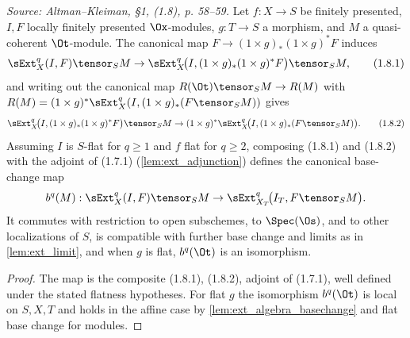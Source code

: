 \begin{definition}
  \label{def:extBaseChangeMap}
  \textit{Source: Altman--Kleiman, §1, (1.8), p. 58--59.}
  Let $f : X \to S$ be finitely presented, $I, F$ locally finitely presented
  $\Ox$-modules, $g : T \to S$ a morphism, and $M$ a quasi-coherent $\Ot$-module.
  The canonical map $F \to (1\times g)_*(1\times g)^* F$ induces
  \[
    \sExt^q_X(I,F) \tensor_S M \to
      \sExt^q_X\!\big(I, (1\times g)_*(1\times g)^* F\big) \tensor_S M,
      \tag{1.8.1}
  \]
  and writing out the canonical map $R(\Ot) \tensor_S M \to R(M)$ with
  $R(M) = (1\times g)^* \sExt^q_X(I, (1\times g)_*(F \tensor_S M))$ gives
  \[
    \sExt^q_X\!\big(I, (1\times g)_*(1\times g)^* F\big) \tensor_S M \to
      (1\times g)^* \sExt^q_X\!\big(I, (1\times g)_*(F \tensor_S M)\big).
      \tag{1.8.2}
  \]
  Assuming $I$ is $S$-flat for $q \geq 1$ and $f$ flat for $q \geq 2$, composing
  \textnormal{(1.8.1)} and \textnormal{(1.8.2)} with the adjoint of
  \textnormal{(1.7.1)} (\cref{lem:ext_adjunction}) defines the canonical
  base-change map
  \[
    b^q(M) : \sExt^q_X(I,F) \tensor_S M \to
      \sExt^q_{X_T}\!\big(I_T, F \tensor_S M\big).
  \]
  It commutes with restriction to open subschemes, to $\Spec(\Os)$, and to other
  localizations of $S$, is compatible with further base change and limits as in
  \cref{lem:ext_limit}, and when $g$ is flat, $b^q(\Ot)$ is an isomorphism.
  \begin{proof}
    The map is the composite \textnormal{(1.8.1)}, \textnormal{(1.8.2)}, adjoint
    of \textnormal{(1.7.1)}, well defined under the stated flatness hypotheses.
    For flat $g$ the isomorphism $b^q(\Ot)$ is local on $S, X, T$ and holds in
    the affine case by \cref{lem:ext_algebra_basechange} and flat base change for
    modules.
  \end{proof}
\end{definition}

